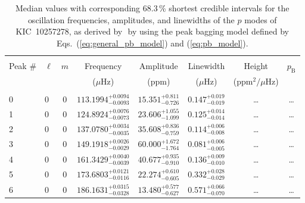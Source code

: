 \begin{table*}[!]
\caption{Median values with corresponding 68.3\,\% shortest credible intervals for the oscillation frequencies, amplitudes, and linewidths of the $p$ modes of KIC~10257278, as derived by \diamonds\,\,by using the peak bagging model defined by Eqs.~(\ref{eq:general_pb_model}) and (\ref{eq:pb_model}).}
\label{tab:10257278p}
\centering
\begin{tabular}{llcrrlrc}
\hline\hline
\\[-8pt]
Peak \# & $\ell$ & $m$ & \multicolumn{1}{c}{Frequency} & \multicolumn{1}{c}{Amplitude} & \multicolumn{1}{c}{Linewidth} & \multicolumn{1}{c}{Height}& $p_\mathrm{B}$\\
 & & & \multicolumn{1}{c}{($\mu$Hz)} & \multicolumn{1}{c}{(ppm)} & \multicolumn{1}{c}{($\mu$Hz)} & \multicolumn{1}{c}{(ppm$^2/\mu$Hz)}\\
\hline \\[-8pt]
0 & 0 & 0 & $    113.1994_{-      0.0093}^{+      0.0094}$ & $      15.351_{-       0.726}^{+       0.811}$ & $       0.147_{-       0.019}^{+       0.019}$ & \multicolumn{1}{c}{\dots} & \dots \\[1pt]
1 & 0 & 0 & $    124.8924_{-      0.0073}^{+      0.0076}$ & $      23.606_{-       1.099}^{+       1.055}$ & $       0.125_{-       0.014}^{+       0.014}$ & \multicolumn{1}{c}{\dots} & \dots \\[1pt]
2 & 0 & 0 & $    137.0780_{-      0.0035}^{+      0.0034}$ & $      35.608_{-       0.759}^{+       0.836}$ & $       0.114_{-       0.008}^{+       0.006}$ & \multicolumn{1}{c}{\dots} & \dots \\[1pt]
3 & 0 & 0 & $    149.1918_{-      0.0029}^{+      0.0026}$ & $      60.000_{-       1.764}^{+       1.672}$ & $       0.081_{-       0.005}^{+       0.006}$ & \multicolumn{1}{c}{\dots} & \dots \\[1pt]
4 & 0 & 0 & $    161.3429_{-      0.0039}^{+      0.0040}$ & $      40.677_{-       0.910}^{+       0.935}$ & $       0.136_{-       0.010}^{+       0.009}$ & \multicolumn{1}{c}{\dots} & \dots \\[1pt]
5 & 0 & 0 & $    173.6803_{-      0.0116}^{+      0.0121}$ & $      22.274_{-       0.605}^{+       0.610}$ & $       0.332_{-       0.029}^{+       0.028}$ & \multicolumn{1}{c}{\dots} & \dots \\[1pt]
6 & 0 & 0 & $    186.1631_{-      0.0328}^{+      0.0315}$ & $      13.480_{-       0.627}^{+       0.577}$ & $       0.571_{-       0.070}^{+       0.066}$ & \multicolumn{1}{c}{\dots} & \dots \\[1pt]

\end{tabular}
\end{table*}
